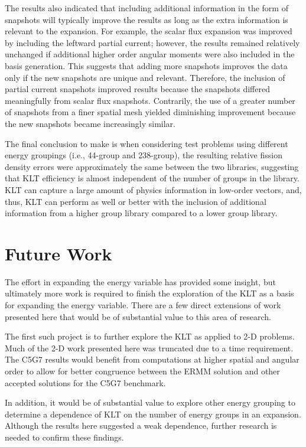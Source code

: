 The results also indicated that including additional information in the form of 
snapshots will typically improve the results as long as the extra information 
is relevant to the expansion.  For example, the scalar flux expansion was 
improved by including the leftward partial current; however, the results 
remained relatively unchanged if additional higher order angular moments were 
also included in the basis generation.  This suggests that adding more snapshots 
improves the data only if the new snapshots are unique and relevant.  Therefore,
the inclusion of partial current snapshots improved results because the 
snapshots differed meaningfully from scalar flux snapshots.
Contrarily, the use of a greater number of snapshots from a finer spatial mesh 
yielded diminishing improvement because the new 
snapshots became increasingly similar.

The final conclusion to make is when considering test problems using different 
energy groupings (i.e., 44-group and 238-group), the resulting relative fission 
density errors were approximately the same between the two libraries, suggesting 
that KLT efficiency is almost independent of the number of groups in the 
library.  KLT can capture a large amount of physics information in 
low-order vectors, and, thus, KLT can perform as well or better with the 
inclusion of additional information from a higher group library compared to a 
lower group library.  

\section{Future Work}

The effort in expanding the energy variable has provided some insight, but 
ultimately more work is required to finish the exploration of the KLT as a 
basis for expanding the energy variable.  There are a few direct extensions of 
work presented here that would be of substantial value to this area of 
research.  

The first such project is to further explore the KLT as applied to 2-D 
problems.  Much of the 2-D work presented here was truncated due to a time 
requirement.  The C5G7 results would benefit from computations at higher 
spatial and angular order to allow for better congruence between the ERMM 
solution and other accepted solutions for the C5G7 benchmark.  

In addition, it would be of substantial value to explore other energy grouping 
to determine a dependence of KLT on the number of energy groups in an 
expansion.  Although the results here suggested a weak dependence, further 
research 
is needed to confirm these findings.  

